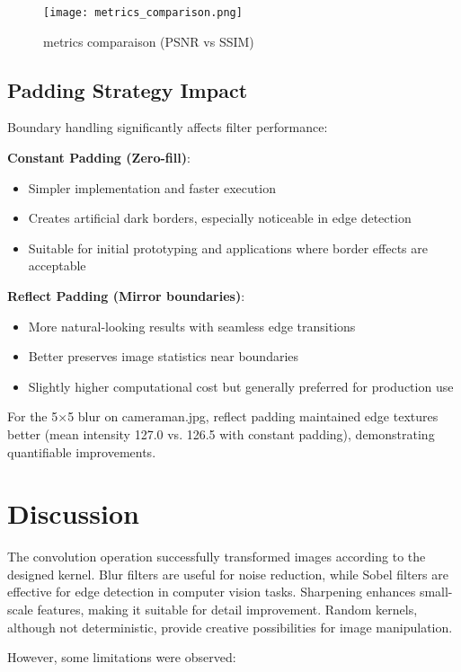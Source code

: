 \documentclass[12pt,a4paper]{article}
\begin{document}
	\begin{figure}
		\centering
		\texttt{[image: metrics\_comparison.png]}
		\caption{metrics comparaison (PSNR vs SSIM)}
		\label{fig:metrics_comparison}
	\end{figure}
	\newpage
	
	\subsection{Padding Strategy Impact}
	
	Boundary handling significantly affects filter performance:
	
	\textbf{Constant Padding (Zero-fill)}:
	\begin{itemize}
		\item Simpler implementation and faster execution
		\item Creates artificial dark borders, especially noticeable in edge detection
		\item Suitable for initial prototyping and applications where border effects are acceptable
	\end{itemize}
	
	\textbf{Reflect Padding (Mirror boundaries)}:
	\begin{itemize}
		\item More natural-looking results with seamless edge transitions
		\item Better preserves image statistics near boundaries
		\item Slightly higher computational cost but generally preferred for production use
	\end{itemize}
	
	For the 5×5 blur on cameraman.jpg, reflect padding maintained edge textures better (mean intensity 127.0 vs. 126.5 with constant padding), demonstrating quantifiable improvements.
	
	\section{Discussion}
	The convolution operation successfully transformed images according to the designed kernel. Blur filters are useful for noise reduction, while Sobel filters are effective for edge detection in computer vision tasks. Sharpening enhances small-scale features, making it suitable for detail improvement. Random kernels, although not deterministic, provide creative possibilities for image manipulation.
	
	However, some limitations were observed:
	
\end{document}
